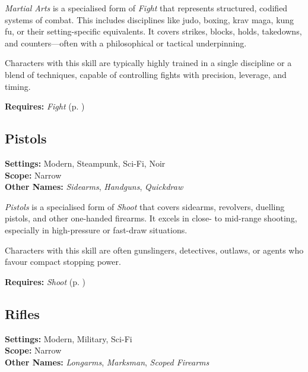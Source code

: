 \emph{Martial Arts} is a specialised form of \emph{Fight} that represents structured, codified systems of combat. This includes disciplines like judo, boxing, krav maga, kung fu, or their setting-specific equivalents. It covers strikes, blocks, holds, takedowns, and counters—often with a philosophical or tactical underpinning.

Characters with this skill are typically highly trained in a single discipline or a blend of techniques, capable of controlling fights with precision, leverage, and timing.

\vspace{0.5\baselineskip}
\noindent\textbf{Requires:} \emph{Fight} (p. \pageref{skill:fight})



\subsection{Pistols}\label{skill:pistols}
\textbf{Settings:} Modern, Steampunk, Sci-Fi, Noir\\
\textbf{Scope:} Narrow\\
\textbf{Other Names:} \emph{Sidearms}, \emph{Handguns}, \emph{Quickdraw}\\
\vspace{\baselineskip}

\emph{Pistols} is a specialised form of \emph{Shoot} that covers sidearms, revolvers, duelling pistols, and other one-handed firearms. It excels in close- to mid-range shooting, especially in high-pressure or fast-draw situations.

Characters with this skill are often gunslingers, detectives, outlaws, or agents who favour compact stopping power.

\vspace{0.5\baselineskip}
\noindent\textbf{Requires:} \emph{Shoot} (p. \pageref{skill:shoot})


\subsection{Rifles}\label{skill:rifles}
\textbf{Settings:} Modern, Military, Sci-Fi\\
\textbf{Scope:} Narrow\\
\textbf{Other Names:} \emph{Longarms}, \emph{Marksman}, \emph{Scoped Firearms}\\
\vspace{\baselineskip}

